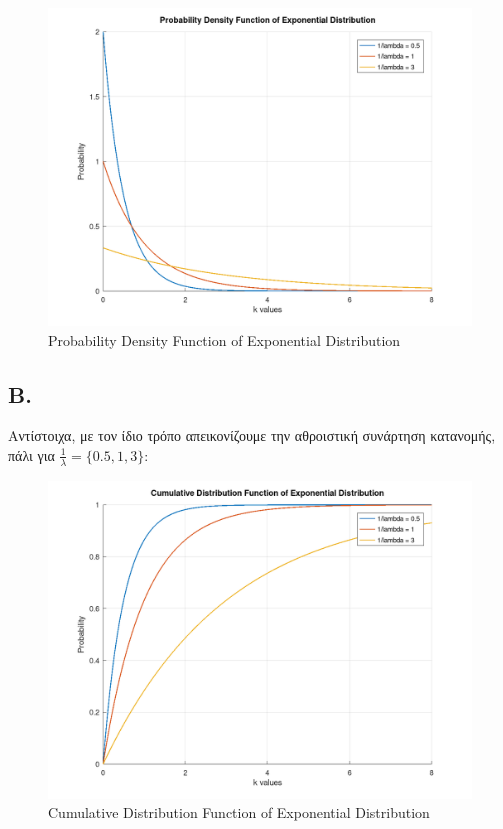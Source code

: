 \documentclass[a4paper]{article}
\begin{document}
\begin{figure}[H]
	\includegraphics[width=\textwidth]{../images/Exponential_Distribution_A.png}
	\caption{Probability Density Function of Exponential Distribution}
	\label{fig:Exponential Distribution A}
\end{figure}

\subsection*{Β.}

Αντίστοιχα, με τον ίδιο τρόπο απεικονίζουμε την αθροιστική συνάρτηση κατανομής, πάλι για $ \frac{1}{λ} = \{0.5,1,3\}$:

\begin{figure}[H]
	\includegraphics[width=\textwidth]{../images/Exponential_Distribution_B.png}
	\caption{Cumulative Distribution Function of Exponential Distribution}
	\label{fig:Exponential Distribution B}
\end{figure}
\end{document}
